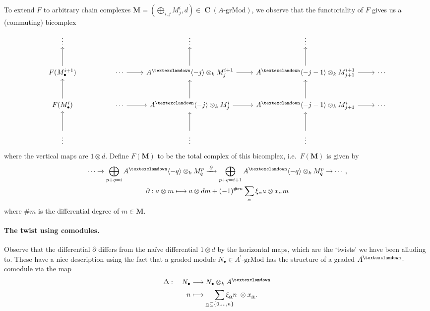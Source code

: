 \documentclass[a4paper]{article}
\theoremstyle{definition}
\theoremstyle{remark}
\newcommand{\grMod}{\ensuremath{\text{-grMod}}}
\DeclareMathOperator{\Ch}{\mathbf{C}}
\newcommand{\gnab}{{\textexclamdown}}
\begin{document}
To extend \(F\) to arbitrary chain complexes \(\mathbf{M}=(\bigoplus_{i,j}M^i_j,
d)\in \Ch(A\grMod)\), we observe that the functoriality of \(F\) gives us a (commuting) bicomplex
\begin{equation}\label{FM-totcomp}
    \begin{tikzcd}[row sep=large]
    \vdots 
           &            
           & 
           & \vdots 
           & \vdots 
           & \\
    F(M^{i+1}_\bullet) \arrow[u]
           & 
           & \cdots \arrow[r]
           & A^\gnab \langle -j \rangle\otimes_k M^{i+1}_j \arrow[r] \arrow[u]
           & A^\gnab \langle -j-1 \rangle\otimes_k M^{i+1}_{j+1} \arrow[r] \arrow[u]
           & \cdots \\
    F(M^{i}_\bullet) \arrow[u]
           & 
           & \cdots \arrow[r]
           & A^\gnab \langle -j \rangle\otimes_k M^{i}_j  \arrow[r] \arrow[u]
           & A^\gnab\langle -j-1 \rangle\otimes_k M^{i}_{j+1}  \arrow[r] \arrow[u]
           & \cdots \\
    \vdots \arrow[u]
           &            
           & 
           & \vdots \arrow[u] 
           & \vdots \arrow[u]
           &   
    \end{tikzcd}
\end{equation}
where the vertical maps are \(1\otimes d\). Define
\(F(\mathbf{M})\) to be the total complex of this bicomplex, i.e.\
\(F(\mathbf{M})\) is given by
\begin{gather}
    \cdots \rightarrow \bigoplus_{p+q=i}A^\gnab\langle -q \rangle \otimes_k
    M^p_q \xrightarrow{\;\partial\;} \bigoplus_{p+q=i+1}A^\gnab\langle -q
    \rangle\otimes_k M^p_q \rightarrow \cdots, \label{F-def} \\
    \partial: a\otimes m \longmapsto a\otimes dm + (-1)^{\#m}\sum_\alpha
    \xi_\alpha a \otimes x_\alpha m \nonumber
\end{gather}
where \(\#m\) is the differential degree of \(m\in \mathbf{M}\). 

\paragraph{The twist using comodules.}
\label{comoduletwist}
Observe that the differential \(\partial\) differs from the na\"ive differential
\(1\otimes d\) by the horizontal maps, which are the
`twists' we have been alluding to. These have a nice description using the fact
that a graded module \(N_\bullet\in A^!\grMod\) has the structure of a
graded \(A^\gnab\)-comodule via the map
\begin{align*}
    \Delta: \quad N_\bullet &\longrightarrow N_\bullet \otimes_k A^\gnab \\
    n &\longmapsto \smashoperator[r]{\sum\limits_{\underline{\alpha}\subseteq
    \{0,...,n\}}} \xi_{\underline{\alpha}} n
    \; \otimes   x_{\underline{\alpha}}.
\end{align*}
\end{document}
